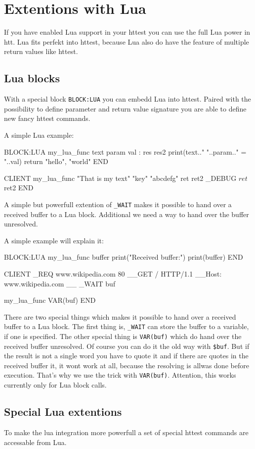 \section{Extentions with Lua}
If you have enabled Lua support in your httest you can use the full Lua
power in htt. Lua fits perfekt into httest, because Lua also do have the feature
of multiple return values like httest. 

\subsection{Lua blocks}
With a special block \texttt{BLOCK:LUA} you can embedd Lua into httest. Paired
with the possibility to define parameter and return value signature you are
able to define new fancy httest commands.

A simple Lua example:

\begin{usplisting}
    BLOCK:LUA my_lua_func text param val : res res2
      print(text.." "..param.." = "..val)
      return "hello", "world"
    END
      
    CLIENT
      my_lua_func "That is my text" "key" "abcdefg" ret ret2
      _DEBUG $ret $ret2
    END
\end{usplisting}

A simple but powerfull extention of \texttt{\_WAIT} makes it possible to hand over a
received buffer to a Lua block. Additional we need a way to hand over the buffer
unresolved. 

A simple example will explain it:

\begin{usplisting}
    BLOCK:LUA my_lua_func buffer
      print("Received buffer:")
      print(buffer)
    END
      
    CLIENT
      _REQ www.wikipedia.com 80
      __GET / HTTP/1.1
      __Host: www.wikipedia.com
      __
      _WAIT buf
      
      my_lua_func VAR(buf)
    END
\end{usplisting}

There are two special things which makes it possible to hand over a received 
buffer to a Lua block. The first thing is, \texttt{\_WAIT} can store the buffer to a
variable, if one is specified. The other special thing is \texttt{VAR(buf)}
which do hand over the received buffer unresolved. Of course you can do it
the old way with \texttt{\$buf}. But if the result is not a single word you have
to quote it and if there are quotes in the received buffer it, it wont work at all,
because the resolving is allwas done before execution. That's why we use
the trick with \texttt{VAR(buf)}. Attention, this works currently only for Lua 
block calls.

\subsection{Special Lua extentions}
To make the lua integration more powerfull a set of special httest commands are
accessable from Lua.

